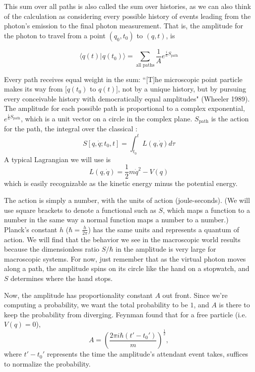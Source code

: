 \documentclass{amsart}
\newcommand{\md}{d}		%
\newcommand{\ket}[1]{\vert \hspace{1pt}#1\rangle}
\newcommand{\braket}[2]{\langle #1 \ket{#2}}
\newcommand{\qv}{q}
\newcommand{\action}[3]{S[#1,\dot{#1};#2,#3]}
\begin{document}
This sum over all paths is also called the sum over histories, as we can also think of the calculation as considering every possible history of events leading from the photon's emission to the final photon measurement.  That is, the amplitude for the photon to travel from a point $(\qv_0,t_0)$ to $(\qv,t)$, is

\begin{equation*}
\braket{\qv(t)}{\qv(t_0)} = \sum_{\text{all paths}} \frac{1}{A} e^{\frac{i}{\hbar}S_{\text{path}}}
\end{equation*}

Every path receives equal weight in the sum: ``[T]he microscopic point particle makes its way from [$\qv(t_0)$ to $\qv(t)$], not by a unique history, but by pursuing every conceivable history with democratically equal amplitudes" (Wheeler 1989).  The amplitude for each possible path is proportional to a complex exponential, $e^{\frac{i}{\hbar}S_{\text{path}}}$, which is a unit vector on a circle in the complex plane.  $S_{\text{path}}$ is the action for the path, the integral over the classical :
\begin{equation*}
\action{\qv}{t_0}{t} = \int_{t_0}^{t} L(\qv,\dot{\qv}) \md \tau
\end{equation*}
A typical Lagrangian we will use is
\begin{equation*}
L(\qv,\dot{\qv}) = \frac{1}{2}m \dot{\qv}^2 - V(\qv)
\end{equation*}
which is easily recognizable as the kinetic energy minus the potential energy.

The action is simply a number, with the units of action (joule-seconds).  (We will use square brackets to denote a functional such as $S$, which maps a function to a number in the same way a normal function maps a number to a number.)  Planck's constant $h$ ($\hbar = \frac{h}{2\pi}$) has the same units and represents a quantum of action.  We will find that the behavior we see in the macroscopic world results because the dimensionless ratio $S/\hbar$ in the amplitude is very large for macroscopic systems.  For now, just remember that as the virtual photon moves along a path, the amplitude spins on its circle like the hand on a stopwatch, and $S$ determines where the hand stops.

Now, the amplitude has proportionality constant $A$ out front.  Since we're computing a probability, we want the total probability to be $1$, and $A$ is there to keep the probability from diverging.  Feynman found that for a free particle (i.e. $V(\qv)=0$),
\begin{equation*}
A = \left( \frac{2 \pi i \hbar (t' - t_0')}{m} \right)^{\frac{1}{2}},
\end{equation*}
where $t' - t_0'$ represents the time the amplitude's attendant event takes, suffices to normalize the probability.
\end{document}
